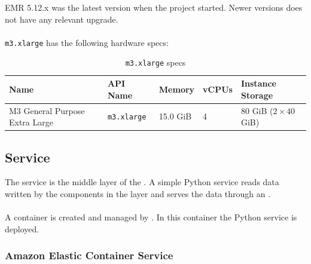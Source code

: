 EMR 5.12.x was the latest version when the project started. Newer versions does not have any relevant upgrade.
\\\\
\texttt{m3.xlarge} has the following hardware specs:

\begin{table}[H]
\centering
\begin{tabular}{|p{3.5cm}|p{2cm}|p{1.5cm}|p{1.5cm}|p{3.5cm}|}
\hline
\textbf{Name}                  & \textbf{API Name}  & \textbf{Memory} & \textbf{vCPUs} & \textbf{Instance Storage}    \\ \hline
M3 General Purpose Extra Large & \texttt{m3.xlarge} & 15.0 GiB        & 4              & 80 GiB (\(2 \times 40\) GiB) \\ \hline
\end{tabular}
\caption{\texttt{m3.xlarge} specs}
\end{table}


\subsection{Service} \label{service}

The service is the middle layer of the \thesis. A simple Python\cite{python} service reads data written by the components in the  layer and serves the data through an .
\\\\
A  container is created and managed by . In this container the Python\cite{python} service is deployed.


\subsubsection*{Amazon Elastic Container Service} \label{ecs}

